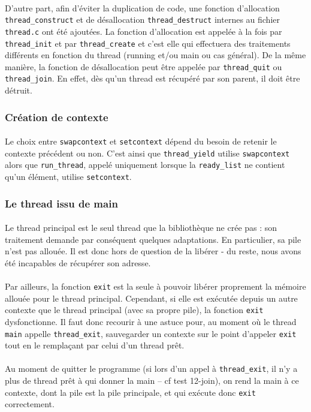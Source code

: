 \paragraph{}
D'autre part, afin d'éviter la duplication de code, une
fonction d'allocation \texttt{thread\_construct} et de désallocation
\texttt{thread\_destruct} internes au fichier \texttt{thread.c} ont
été ajoutées. La fonction d'allocation est appelée à la fois par
\texttt{thread\_init} et par \texttt{thread\_create} et c'est elle qui
effectuera des traitements différents en fonction du thread (running
et/ou main ou cas général). De la même manière, la fonction de
désallocation peut être appelée par \texttt{thread\_quit} ou
\texttt{thread\_join}. En effet, dès qu'un thread est récupéré par son
parent, il doit être détruit.

\subsubsection{Création de contexte}

\paragraph{}
Le choix entre \texttt{swapcontext} et \texttt{setcontext} dépend du
 besoin de retenir le contexte précédent ou non. C'est ainsi que 
\texttt{thread\_yield} utilise \texttt{swapcontext} alors que 
\texttt{run\_thread}, appelé uniquement lorsque la \texttt{ready\_list}
ne contient qu'un élément, utilise \texttt{setcontext}. 

\subsubsection{Le thread issu de main}

\paragraph{}
Le thread principal est le seul thread que la bibliothèque ne crée
pas : son traitement demande par conséquent quelques adaptations.
En particulier, sa pile n'est pas allouée. Il est donc hors de
question de la libérer - du reste, nous avons été incapables de
récupérer son adresse.

\paragraph{}
Par ailleurs, la fonction \texttt{exit} est la seule à pouvoir libérer proprement la mémoire allouée pour le thread principal. Cependant, si elle est exécutée depuis un autre contexte que le thread principal (avec sa propre pile), la fonction \texttt{exit} dysfonctionne.%
Il faut donc recourir à une astuce pour, au moment où le thread \texttt{main}
appelle \texttt{thread\_exit}, sauvegarder un contexte sur le point
d'appeler \texttt{exit} tout en le remplaçant par celui d'un thread
prêt.

\paragraph{}
Au moment de quitter le programme (si lors d'un appel à
\texttt{thread\_exit}, il n'y a plus de thread prêt à qui donner la
main -- cf test 12-join), on rend la main à ce contexte, dont la pile
est la pile principale, et qui exécute donc \texttt{exit} correctement.
